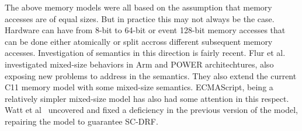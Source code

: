 The above memory models were all based on the assumption that memory accesses are of equal sizes. But in practice this may not always be the case. Hardware can have from 8-bit to 64-bit or event 128-bit memory accesses that can be done either atomically or split accross different subsequent memory accesses. 
Investigation of semantics in this direction is fairly recent.
Flur et al.~\cite{Flur} investigated mixed-size behaviors in Arm and POWER architechtures, also exposing new problems to address in the semantics. They also extend the current C11 memory model with some mixed-size semantics.
ECMAScript, being a relatively simpler mixed-size model has also had some attention in this respect. Watt et al~\cite{WattC} uncovered and fixed a deficiency in the previous version of the model, repairing the model to guarantee SC-DRF.

